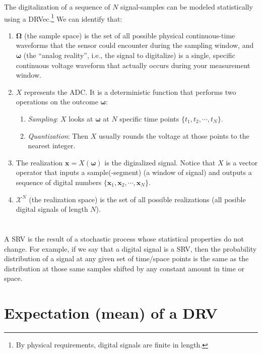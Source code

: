 \label{sec:statistical_model}
The digitalization of a sequence of $N$ signal-samples can be modeled
statistically using a \gls{DRVec}.\footnote{By physical requirements,
  digital signals are finite in length.} We can identify that:
\begin{enumerate}
\item $\bm{\Omega}$ (the sample space) is the set of all possible physical
  continuous-time waveforms that the sensor could encounter during the
  sampling window, and $\bm{\omega}$ (the ``analog reality'', i.e., the
  signal to digitalize) is a single, specific continuous voltage
  waveform that actually occurs during your measurement
  window.
\item $X$ represents the \gls{ADC}. It is a deterministic
  function that performs two operations on the outcome $\bm{\omega}$:
  \begin{enumerate}
  \item \emph{Sampling}: $X$ looks at $\bm{\omega}$ at $N$
    specific time points $\{t_1,t_2,\cdots,t_N\}$.
  \item \emph{Quantization}: Then $X$ usually rounds the voltage at those
    points to the nearest integer.
  \end{enumerate}
\item The realization $\bm{x}=X(\bm{\omega})$ is the digizalized
  signal. Notice that $X$ is a vector operator that inputs a
  sample(-segment) (a window of signal) and outputs a sequence of
  digital numbers $\{\bm{x}_1,\bm{x}_2,\cdots,\bm{x}_N\}$.
\item $\mathcal{X}^{N}$ (the realization space) is the set of all possible
  realizations (all posible digital signals of length $N$).
\end{enumerate}


\section{}

A \gls{SRV} is the result of a stochastic process whose statistical
properties do not change. For example, if we say that a digital signal
is a \gls{SRV}, then the probability distribution of a signal at any
given set of time/space points is the same as the distribution at
those same samples shifted by any constant amount in time or space.


\section{Expectation (mean) of a \gls{DRV}}

